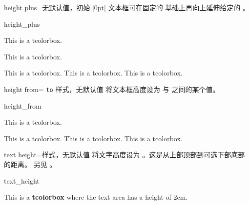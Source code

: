 \enlargethispage*{10mm}
\begin{docTcbKey}{height plus}{=}{无默认值，初始 |0pt|}
  文本框可在固定的  基础上再向上延伸给定的 。
\begin{exdispExample}{height_plus}

\begin{tcolorbox}[height=1cm]
This is a tcolorbox.
\end{tcolorbox}
\begin{tcolorbox}[height=1cm,height plus=1cm]
This is a tcolorbox.
\end{tcolorbox}
\begin{tcolorbox}[height=1cm,height plus=1cm]
This is a tcolorbox. This is a tcolorbox. This is a tcolorbox.
\end{tcolorbox}
\end{exdispExample}
\end{docTcbKey}


\begin{docTcbKey}{height from}{= \texttt{to} }{样式，无默认值}
  将文本框高度设为  与  之间的某个值。
\begin{exdispExample}{height_from}

\begin{mybox}
This is a tcolorbox.
\end{mybox}
\begin{mybox}
This is a tcolorbox. This is a tcolorbox. This is a tcolorbox.
\end{mybox}
\begin{mybox}
\lipsum[2]
\end{mybox}
\end{exdispExample}
\end{docTcbKey}


\begin{docTcbKey}[][doc new=2014-10-31]{text height}{=}{样式，无默认值}
  将文字高度设为 。这是从上部顶部到可选下部底部的距离。
  另见 。
\begin{exdispExample}{text_height}

\begin{tcolorbox}[text height=2cm]
This is a \textbf{tcolorbox} where the text area has a height of 2cm.
\end{tcolorbox}
\end{exdispExample}
\end{docTcbKey}

